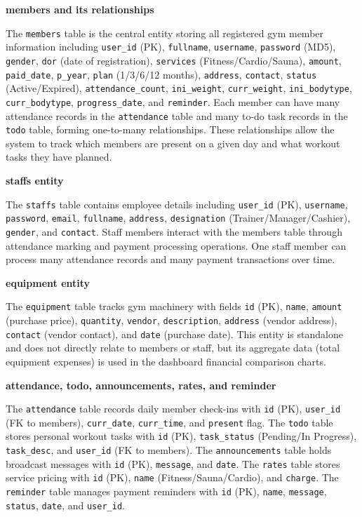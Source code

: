 \documentclass[12pt,a4paper]{report}
\begin{document}
\textbf{members and its relationships}

The \texttt{members} table is the central entity storing all registered gym member information including \texttt{user\_id} (PK), \texttt{fullname}, \texttt{username}, \texttt{password} (MD5), \texttt{gender}, \texttt{dor} (date of registration), \texttt{services} (Fitness/Cardio/Sauna), \texttt{amount}, \texttt{paid\_date}, \texttt{p\_year}, \texttt{plan} (1/3/6/12 months), \texttt{address}, \texttt{contact}, \texttt{status} (Active/Expired), \texttt{attendance\_count}, \texttt{ini\_weight}, \texttt{curr\_weight}, \texttt{ini\_bodytype}, \texttt{curr\_bodytype}, \texttt{progress\_date}, and \texttt{reminder}. Each member can have many attendance records in the \texttt{attendance} table and many to-do task records in the \texttt{todo} table, forming one-to-many relationships. These relationships allow the system to track which members are present on a given day and what workout tasks they have planned.

\textbf{staffs entity}

The \texttt{staffs} table contains employee details including \texttt{user\_id} (PK), \texttt{username}, \texttt{password}, \texttt{email}, \texttt{fullname}, \texttt{address}, \texttt{designation} (Trainer/Manager/Cashier), \texttt{gender}, and \texttt{contact}. Staff members interact with the members table through attendance marking and payment processing operations. One staff member can process many attendance records and many payment transactions over time.

\textbf{equipment entity}

The \texttt{equipment} table tracks gym machinery with fields \texttt{id} (PK), \texttt{name}, \texttt{amount} (purchase price), \texttt{quantity}, \texttt{vendor}, \texttt{description}, \texttt{address} (vendor address), \texttt{contact} (vendor contact), and \texttt{date} (purchase date). This entity is standalone and does not directly relate to members or staff, but its aggregate data (total equipment expenses) is used in the dashboard financial comparison charts.

\textbf{attendance, todo, announcements, rates, and reminder}

The \texttt{attendance} table records daily member check-ins with \texttt{id} (PK), \texttt{user\_id} (FK to members), \texttt{curr\_date}, \texttt{curr\_time}, and \texttt{present} flag. The \texttt{todo} table stores personal workout tasks with \texttt{id} (PK), \texttt{task\_status} (Pending/In Progress), \texttt{task\_desc}, and \texttt{user\_id} (FK to members). The \texttt{announcements} table holds broadcast messages with \texttt{id} (PK), \texttt{message}, and \texttt{date}. The \texttt{rates} table stores service pricing with \texttt{id} (PK), \texttt{name} (Fitness/Sauna/Cardio), and \texttt{charge}. The \texttt{reminder} table manages payment reminders with \texttt{id} (PK), \texttt{name}, \texttt{message}, \texttt{status}, \texttt{date}, and \texttt{user\_id}.
\end{document}
